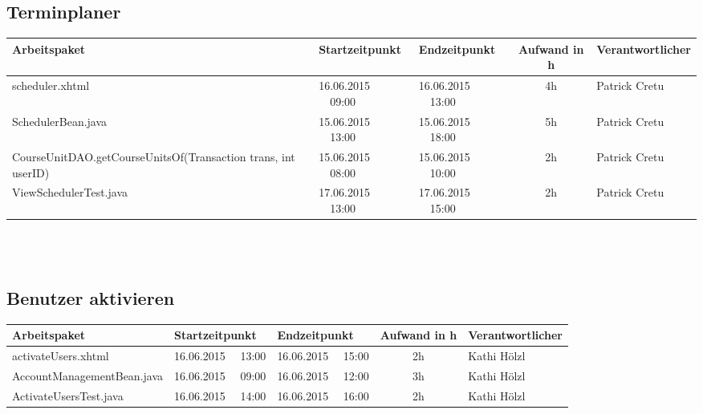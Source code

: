 \begin{landscape}
	\subsection{Terminplaner}
	\begin{tabular}{|p{10.3cm}|p{3.2cm}|p{3.2cm}|c|p{3.5cm}|}
		\hline  \textbf{Arbeitspaket} & \textbf{Startzeitpunkt} & \textbf{Endzeitpunkt} & \textbf{Aufwand in h} & \textbf{Verantwortlicher} \\ 
		\hline   scheduler.xhtml                                 & 16.06.2015 \ \ 09:00        & 16.06.2015 \ \ 13:00        &  4h                 & Patrick Cretu\\ 
		\hline   SchedulerBean.java                              & 15.06.2015 \ \ 13:00        & 15.06.2015 \ \ 18:00        &  5h                 & Patrick Cretu\\ 
		\hline   CourseUnitDAO.getCourseUnitsOf(Transaction trans, int userID)  & 15.06.2015 \ \ 08:00        & 15.06.2015 \ \ 10:00        &  2h  & Patrick Cretu\\ 
		\hline ViewSchedulerTest.java & 17.06.2015 \ \ 13:00 & 17.06.2015 \ \ 15:00 & 2h & Patrick Cretu\\
		\hline 
	\end{tabular} \ \\
	\ \\
	
	\subsection{Benutzer aktivieren}
	\begin{tabular}{|p{10.3cm}|p{3.2cm}|p{3.2cm}|c|p{3.5cm}|}
		\hline  \textbf{Arbeitspaket} & \textbf{Startzeitpunkt} & \textbf{Endzeitpunkt} & \textbf{Aufwand in h} & \textbf{Verantwortlicher} \\ 
		\hline   activateUsers.xhtml                                 & 16.06.2015 \ \ 13:00     & 16.06.2015 \ \ 15:00     &      2h               & Kathi Hölzl\\
		\hline   AccountManagementBean.java                          & 16.06.2015 \ \ 09:00     & 16.06.2015 \ \ 12:00     &      3h               & Kathi Hölzl\\
		\hline   ActivateUsersTest.java                                & 16.06.2015 \ \ 14:00     & 16.06.2015 \ \ 16:00     &      2h               & Kathi Hölzl\\
		\hline 
	\end{tabular} \ \\
	\ \\
	

\end{landscape}
